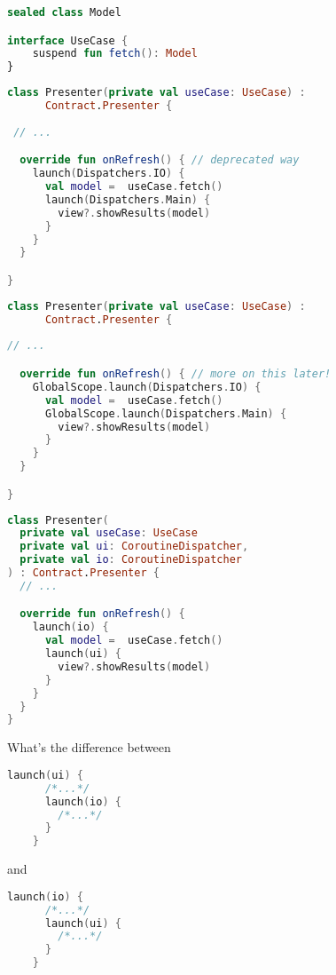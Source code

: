 \documentclass[10pt]{beamer}
\begin{document}
\begin{frame}[fragile]
\begin{lstlisting}[language=Kotlin, basicstyle=\ttfamily]
sealed class Model

interface UseCase {
    suspend fun fetch(): Model
}
\end{lstlisting}
\end{frame}


\begin{frame}[fragile]
\begin{lstlisting}[language=Kotlin, basicstyle=\ttfamily]
class Presenter(private val useCase: UseCase) : 
      Contract.Presenter {
 
 // ...

  override fun onRefresh() { // deprecated way
    launch(Dispatchers.IO) {
      val model =  useCase.fetch()
      launch(Dispatchers.Main) {
        view?.showResults(model)
      }
    }
  }

}
\end{lstlisting}
\end{frame}

\begin{frame}[fragile]
\begin{lstlisting}[language=Kotlin, basicstyle=\ttfamily]
class Presenter(private val useCase: UseCase) : 
      Contract.Presenter {
  
// ...

  override fun onRefresh() { // more on this later!
    GlobalScope.launch(Dispatchers.IO) {
      val model =  useCase.fetch()
      GlobalScope.launch(Dispatchers.Main) {
        view?.showResults(model)
      }
    }
  }

}
\end{lstlisting}
\end{frame}

\begin{frame}[fragile]
\begin{lstlisting}[language=Kotlin, basicstyle=\ttfamily]
class Presenter(
  private val useCase: UseCase
  private val ui: CoroutineDispatcher,
  private val io: CoroutineDispatcher
) : Contract.Presenter {
  // ...

  override fun onRefresh() {
    launch(io) {
      val model =  useCase.fetch()
      launch(ui) {
        view?.showResults(model)
      }
    }
  }
}
\end{lstlisting}
\end{frame}

\begin{frame}[fragile]
What's the difference between 
\begin{lstlisting}[language=Kotlin, basicstyle=\ttfamily]
    launch(ui) { 
      /*...*/
      launch(io) {
        /*...*/
      }
    }
\end{lstlisting}
and
\begin{lstlisting}[language=Kotlin, basicstyle=\ttfamily]
    launch(io) { 
      /*...*/
      launch(ui) {
        /*...*/
      }
    }
\end{lstlisting}
\end{frame}
\end{document}
